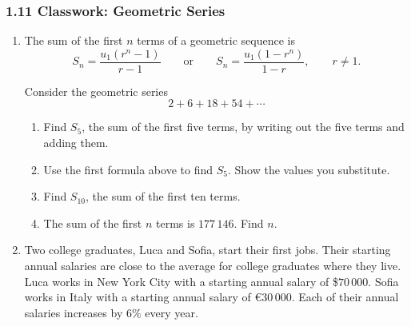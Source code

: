 \documentclass[12pt, twoside]{article}
\begin{document}
\subsubsection*{1.11 Classwork: Geometric Series}

\begin{enumerate}[itemsep=0.15cm]

\item[1.]

The sum of the first $n$ terms of a geometric sequence is
$$S_{n} = \frac{u_{1}\left(r^{n} - 1\right)}{r - 1}
\qquad \text{or} \qquad
S_{n} = \frac{u_{1}\left(1 - r^{n}\right)}{1 - r},
\qquad r \neq 1.$$

Consider the geometric series
$$2 + 6 + 18 + 54 + \cdots$$

\begin{enumerate}[itemsep=0.1cm]
  \item Find $S_{5}$, the sum of the first five terms, by writing out
  the five terms and adding them.
  \item Use the first formula above to find $S_{5}$. Show the values
  you substitute.
  \item Find $S_{10}$, the sum of the first ten terms.
  \item The sum of the first $n$ terms is $177\,146$. Find $n$.
\end{enumerate}


\newpage

\item[2.]

Two college graduates, Luca and Sofia, start their first jobs. Their
starting annual salaries are close to the average for college graduates
where they live. Luca works in New York City with a starting annual salary
of \$$70\,000$. Sofia works in Italy with a starting annual salary of
\euro$30\,000$. Each of their annual salaries increases by $6\%$ every year.


\end{enumerate}
\end{document}
